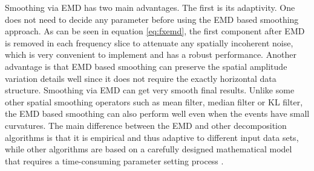 Smoothing via EMD has two main advantages. The first is its adaptivity. One does not need to decide any parameter before using the EMD based smoothing approach. As can be seen in equation \ref{eq:fxemd}, the first component after EMD is removed in each frequency slice to attenuate any spatially incoherent noise, which is very convenient to implement and has a robust performance. Another advantage is that EMD based smoothing can preserve the spatial amplitude variation details well since it does not require the exactly horizontal data structure. Smoothing via EMD can get very smooth final results. Unlike some other spatial smoothing operators such as mean filter, median filter or KL filter, the EMD based smoothing can also perform well even when the events have small curvatures. The main difference between the EMD and other decomposition algorithms is that it is empirical and thus adaptive to different input data sets, while other algorithms are based on a carefully designed mathematical model that requires a time-consuming parameter setting process \cite{liuwei2016,liuwei2016vmd,huijian2016}.





